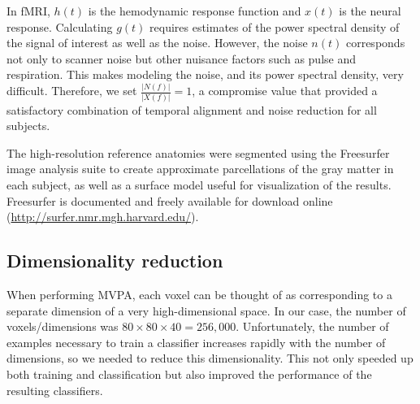 \documentclass[review,1p,authoryear]{elsarticle}
\begin{document}
In fMRI, $h(t)$ is the hemodynamic response function and $x(t)$ is the neural response.
Calculating $g(t)$ requires estimates of the power spectral density of the signal of interest as well as the noise.
However, the noise $n(t)$ corresponds not only to scanner noise but other nuisance factors such as pulse and respiration.
This makes modeling the noise, and its power spectral density, very difficult.
Therefore, we set $\frac{\left| N(f) \right|}{\left| X(f) \right|} = 1$, a compromise value that provided a satisfactory combination of temporal alignment and noise reduction for all subjects.

The high-resolution reference anatomies were segmented using the Freesurfer image analysis suite to create approximate parcellations of the gray matter in each subject, as well as a surface model useful for visualization of the results.
Freesurfer is documented and freely available for download online (\url{http://surfer.nmr.mgh.harvard.edu/}).

\subsection{Dimensionality reduction}
When performing MVPA, each voxel can be thought of as corresponding to a separate dimension of a very high-dimensional space.
In our case, the number of voxels/dimensions was $80 \times 80 \times 40 = 256,000$.
Unfortunately, the number of examples necessary to train a classifier increases rapidly with the number of dimensions, so we needed to reduce this dimensionality.
This not only speeded up both training and classification but also improved the performance of the resulting classifiers.
\end{document}
